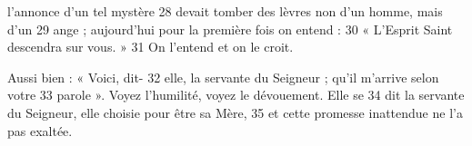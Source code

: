 l'annonce d'un tel mystère	 
28	 	devait tomber des lèvres non d'un homme, mais d'un	 
29	 	ange ; aujourd'hui pour la première fois on entend :	 
30	 	« L'Esprit Saint descendra sur vous. »	 
31	 	On l'entend et on le croit.

Aussi bien : « Voici, dit-	 
32	 	elle, la servante du Seigneur ; qu'il m'arrive selon votre	 
33	 	parole ». Voyez l'humilité, voyez le dévouement. Elle se	 
34	 	dit la servante du Seigneur, elle choisie pour être sa Mère,	 
35	 	et cette promesse inattendue ne l'a pas exaltée.
